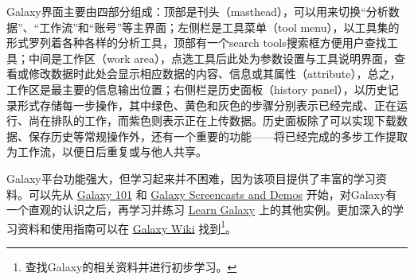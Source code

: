 \documentclass[11pt,a4paper,twoside]{book}
\begin{document}
Galaxy界面主要由四部分组成：顶部是刊头（masthead），可以用来切换“分析数据”、“工作流”和“账号”等主界面；左侧栏是工具菜单（tool menu），以工具集的形式罗列着各种各样的分析工具，顶部有一个search tools搜索框方便用户查找工具；中间是工作区（work area），点选工具后此处为参数设置与工具说明界面，查看或修改数据时此处会显示相应数据的内容、信息或其属性（attribute），总之，工作区是最主要的信息输出位置；右侧栏是历史面板（history panel），以历史记录形式存储每一步操作，其中绿色、黄色和灰色的步骤分别表示已经完成、正在运行、尚在排队的工作，而紫色则表示正在上传数据。历史面板除了可以实现下载数据、保存历史等常规操作外，还有一个重要的功能——将已经完成的多步工作提取为工作流，以便日后重复或与他人共享。

Galaxy平台功能强大，但学习起来并不困难，因为该项目提供了丰富的学习资料。可以先从 \href{http://main.g2.bx.psu.edu/galaxy101}{Galaxy 101} 和 \href{http://wiki.galaxyproject.org/Learn/Screencasts}{Galaxy Screencasts and Demos} 开始，对Galaxy有一个直观的认识之后，再学习并练习 \href{http://wiki.galaxyproject.org/Learn}{Learn Galaxy} 上的其他实例。更加深入的学习资料和使用指南可以在 \href{http://wiki.galaxyproject.org/FrontPage}{Galaxy Wiki} 找到\footnote{查找Galaxy的相关资料并进行初步学习。}。
\end{document}
